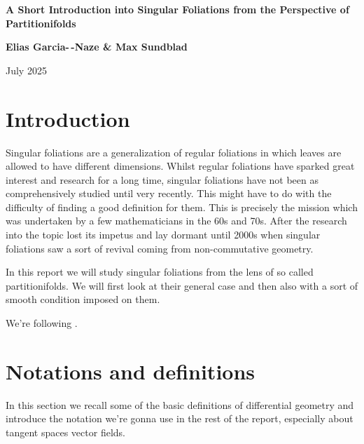 



\begin{titlepage}
   \begin{center}
       \vspace*{4cm}

       {\LARGE
       \bf
       A Short Introduction into Singular Foliations from the Perspective of Partitionifolds
       }

       \vspace{1cm}

       {\large
       \textbf{Elias Garcia-\,\!-Naze \& Max Sundblad}
       }

       \vspace{0.5cm}

       July 2025
   \end{center}
\end{titlepage}

\tableofcontents

\newpage

\section{Introduction}
    Singular foliations are a generalization of regular foliations in which leaves are allowed to have different dimensions. Whilst regular foliations have sparked great interest and research for a long time, singular foliations have not been as comprehensively studied until very recently. This might have to do with the difficulty of finding a good definition for them. This is precisely the mission which was undertaken by a few mathematicians in the 60s and 70s. After the research into the topic lost its impetus and lay dormant until 2000s when singular foliations saw a sort of revival coming from non-commutative geometry.

    In this report we will study singular foliations from the lens of so called partitionifolds. We will first look at their general case and then also with a sort of smooth condition imposed on them.

    We're following \cite{laurent-gengouxInvitationSingularFoliations2024a}.

\section{Notations and definitions}
    In this section we recall some of the basic definitions of differential geometry and introduce the notation we're gonna use in the rest of the report, especially about tangent spaces vector fields.

